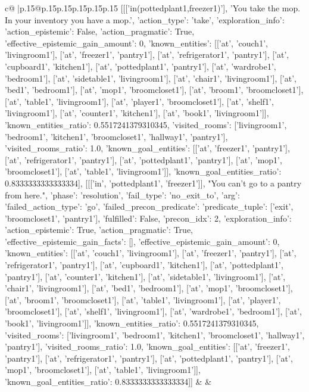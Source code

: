 \documentclass{article}
\begin{document}
{\begin{supertabular}{c@{$\;$}|p{.15\linewidth}@{}p{.15\linewidth}p{.15\linewidth}p{.15\linewidth}p{.15\linewidth}p{.15\linewidth}}
{{{	 [[['in(pottedplant1,freezer1)'], 'You take the mop. In your inventory you have a mop.', {'action_type': 'take', 'exploration_info': {'action_epistemic': False, 'action_pragmatic': True, 'effective_epistemic_gain_amount': 0, 'known_entities': [['at', 'couch1', 'livingroom1'], ['at', 'freezer1', 'pantry1'], ['at', 'refrigerator1', 'pantry1'], ['at', 'cupboard1', 'kitchen1'], ['at', 'pottedplant1', 'pantry1'], ['at', 'wardrobe1', 'bedroom1'], ['at', 'sidetable1', 'livingroom1'], ['at', 'chair1', 'livingroom1'], ['at', 'bed1', 'bedroom1'], ['at', 'mop1', 'broomcloset1'], ['at', 'broom1', 'broomcloset1'], ['at', 'table1', 'livingroom1'], ['at', 'player1', 'broomcloset1'], ['at', 'shelf1', 'livingroom1'], ['at', 'counter1', 'kitchen1'], ['at', 'book1', 'livingroom1']], 'known_entities_ratio': 0.5517241379310345, 'visited_rooms': ['livingroom1', 'bedroom1', 'kitchen1', 'broomcloset1', 'hallway1', 'pantry1'], 'visited_rooms_ratio': 1.0, 'known_goal_entities': [['at', 'freezer1', 'pantry1'], ['at', 'refrigerator1', 'pantry1'], ['at', 'pottedplant1', 'pantry1'], ['at', 'mop1', 'broomcloset1'], ['at', 'table1', 'livingroom1']], 'known_goal_entities_ratio': 0.8333333333333334}}], [[['in', 'pottedplant1', 'freezer1']], "You can't go to a pantry from here.", {'phase': 'resolution', 'fail_type': 'no_exit_to', 'arg': {'failed_action_type': 'go', 'failed_precon_predicate': {'predicate_tuple': ['exit', 'broomcloset1', 'pantry1'], 'fulfilled': False, 'precon_idx': 2}}, 'exploration_info': {'action_epistemic': True, 'action_pragmatic': True, 'effective_epistemic_gain_facts': [], 'effective_epistemic_gain_amount': 0, 'known_entities': [['at', 'couch1', 'livingroom1'], ['at', 'freezer1', 'pantry1'], ['at', 'refrigerator1', 'pantry1'], ['at', 'cupboard1', 'kitchen1'], ['at', 'pottedplant1', 'pantry1'], ['at', 'counter1', 'kitchen1'], ['at', 'sidetable1', 'livingroom1'], ['at', 'chair1', 'livingroom1'], ['at', 'bed1', 'bedroom1'], ['at', 'mop1', 'broomcloset1'], ['at', 'broom1', 'broomcloset1'], ['at', 'table1', 'livingroom1'], ['at', 'player1', 'broomcloset1'], ['at', 'shelf1', 'livingroom1'], ['at', 'wardrobe1', 'bedroom1'], ['at', 'book1', 'livingroom1']], 'known_entities_ratio': 0.5517241379310345, 'visited_rooms': ['livingroom1', 'bedroom1', 'kitchen1', 'broomcloset1', 'hallway1', 'pantry1'], 'visited_rooms_ratio': 1.0, 'known_goal_entities': [['at', 'freezer1', 'pantry1'], ['at', 'refrigerator1', 'pantry1'], ['at', 'pottedplant1', 'pantry1'], ['at', 'mop1', 'broomcloset1'], ['at', 'table1', 'livingroom1']], 'known_goal_entities_ratio': 0.8333333333333334}}]] 
	  } 
	   } 
	   } 
	 & & \\ 
 


\end{supertabular}}
\end{document}
